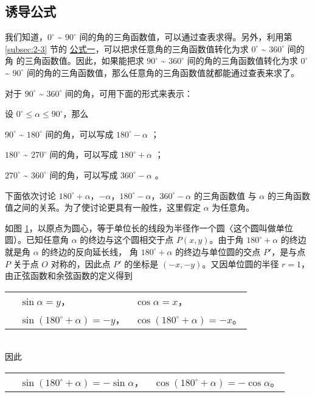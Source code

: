 \subsection{诱导公式}\label{subsec:2-5}

我们知道，$0^\circ$ \~{} $90^\circ$ 间的角的三角函数值，可以通过查表求得。另外，利用第 \ref{subsec:2-3}
节的 \hyperref[gongshi:1]{公式一}，可以把求任意角的三角函数值转化为求 $0^\circ$ \~{} $360^\circ$ 间的角
的三角函数值。因此，如果能把求 $90^\circ$ \~{} $360^\circ$ 间的角的三角函数值转化为求 $0^\circ$ \~{} $90^\circ$
间的角的三角函数值，那么任意角的三角函数值就都能通过查表来求了。

对于 $90^\circ$ \~{} $360^\circ$ 间的角，可用下面的形式来表示：

设 $0^\circ \leqslant \alpha \leqslant 90^\circ$，那么

$90^\circ$ \~{} $180^\circ$ 间的角，可以写成 $180^\circ - \alpha$ ；

$180^\circ$ \~{} $270^\circ$ 间的角，可以写成 $180^\circ + \alpha$ ；

$270^\circ$ \~{} $360^\circ$ 间的角，可以写成 $360^\circ - \alpha$ 。

下面依次讨论 $180^\circ + \alpha$，$-\alpha$，$180^\circ - \alpha$，$360^\circ - \alpha$ 的三角函数值
与 $\alpha$ 的三角函数值之间的关系。为了使讨论更具有一般性，这里假定 $\alpha$ 为任意角。

\begin{figure}[htbp]
    \centering
    
    \caption{}\label{fig:2-15}
\end{figure}

如图 \ref{fig:2-15}，以原点为圆心，等于单位长的线段为半径作一个圆〈这个圆叫做单位圆）。已知任意角 $\alpha$
的终边与这个圆相交于点 $P(x, y)$。由于角 $180^\circ + \alpha$ 的终边就是角 $\alpha$ 的终边的反向延长线，
角 $180^\circ + \alpha$ 的终边与单位圆的交点 $P'$，是与点 $P$ 关于点 $O$ 对称的，因此点 $P'$ 的坐标是
$(-x, -y)$。又因单位圆的半径 $r = 1$，由正弦函数和余弦函数的定义得到 \\
\begin{tabular}{p{5em}p{12em}l}
    & $\sin\alpha = y$， & $\cos\alpha = x$，\\
    & $\sin(180^\circ + \alpha) = -y$，& $\cos(180^\circ + \alpha) = -x$。
\end{tabular} \\
因此 \\
\begin{tabular}{p{5em}p{12em}l}
    & $\sin(180^\circ + \alpha) = -\sin\alpha$，& $\cos(180^\circ + \alpha) = -\cos\alpha$。
\end{tabular}

